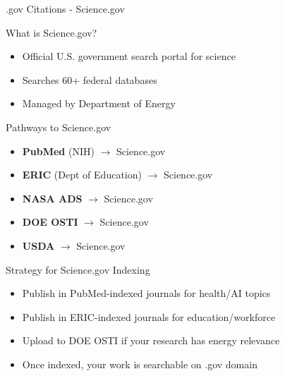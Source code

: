 \documentclass[11pt]{beamer}
\begin{document}
	\begin{frame}{.gov Citations - Science.gov}
		\scriptsize
		\begin{block}{What is Science.gov?}
			\begin{itemize}
				\item Official U.S. government search portal for science
				\item Searches 60+ federal databases
				\item Managed by Department of Energy
			\end{itemize}
		\end{block}
		\begin{block}{Pathways to Science.gov}
			\begin{itemize}
				\item \textbf{PubMed} (NIH) $\rightarrow$ Science.gov
				\item \textbf{ERIC} (Dept of Education) $\rightarrow$ Science.gov
				\item \textbf{NASA ADS} $\rightarrow$ Science.gov
				\item \textbf{DOE OSTI} $\rightarrow$ Science.gov
				\item \textbf{USDA} $\rightarrow$ Science.gov
			\end{itemize}
		\end{block}
		\begin{block}{Strategy for Science.gov Indexing}
			\begin{itemize}
				\item Publish in PubMed-indexed journals for health/AI topics
				\item Publish in ERIC-indexed journals for education/workforce
				\item Upload to DOE OSTI if your research has energy relevance
				\item Once indexed, your work is searchable on .gov domain
			\end{itemize}
		\end{block}
	\end{frame}
	
\end{document}
